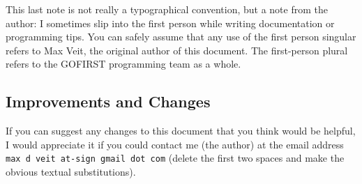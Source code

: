 \documentclass[12pt]{article}
\begin{document}
This last note is not really a typographical convention, but a note from the author: I sometimes slip into the first person while writing documentation or programming tips. You can safely assume that any use of the first person singular refers to Max Veit, the original author of this document. The first-person plural refers to the GOFIRST programming team as a whole.

\subsection{Improvements and Changes}
If you can suggest any changes to this document that you think would be helpful, I would appreciate it if you could contact me (the author) at the email address \texttt{max d veit at-sign gmail dot com} (delete the first two spaces and make the obvious textual substitutions).
\end{document}
